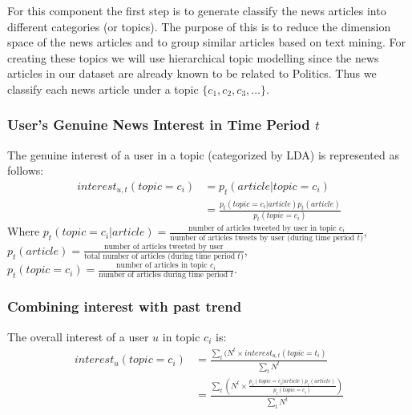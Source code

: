 \documentclass{article}
\begin{document}
For this component the first step is to generate classify the news articles into different categories (or topics). The purpose of this is to reduce the dimension space of the news articles and to group similar articles based on text mining. For creating these topics we will use hierarchical topic modelling since the news articles in our dataset are already known to be related to Politics. Thus we classify each news article under a topic $\{c_1, c_2, c_3, \ldots \}$. \\

\subsubsection{User’s Genuine News Interest in Time Period $t$}

The genuine interest of a user in a topic (categorized by LDA) is represented as follows:
\begin{equation}
\begin{aligned} 
interest_{u,t}(topic = c_i) 
& = p_t(article | topic = c_i) \\
& = \frac{p_t(topic = c_i| article) p_t(article)}{p_t(topic = c_i)}
\end{aligned}
\end{equation}
Where $p_t(topic = c_i| article) = \displaystyle \frac{\textrm{number of articles tweeted by user in topic $c_i$}}{\textrm{number of articles tweets by user (during time period $t$)}}$, \\
$p_t(article) = \displaystyle \frac{\textrm{number of articles tweeted by user}}{\textrm{total number of articles (during time period $t$)}}$, \\
$p_t(topic = c_i) = \displaystyle \frac{\textrm{number of articles in topic $c_i$}}{\textrm{number of articles during time period $t$}} $.


\subsubsection{Combining interest with past trend}

The overall interest of a user $u$ in topic $c_i$ is: \\
\begin{equation}
\begin{aligned}
interest_u(topic = c_i) 
& = \displaystyle \frac{\sum_{t}(N^t \times interest_{u,t}(topic = t_i)}{\sum_{t} N^t}	 \\
& = \displaystyle\frac{\sum_{t} \left(N^t \times \displaystyle\frac{p_t(topic = c_i| article) p_t(article)}{p_t(topic = c_i)}\right)}{\sum_{t} N^t} \\
\end{aligned}    
\end{equation}
\end{document}
